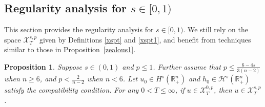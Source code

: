 \documentclass[preprint,compress,12pt]{elsarticle}
\newtheorem{proposition}[theorem]{Proposition}
\numberwithin{equation}{section}
\begin{document}
\subsection{Regularity analysis for $s\in[0,1)$}\label{painstakingly}
This section provides the regularity analysis for  $s\in[0,1)$. We still rely on the space $\mathscr{X}^{s,p}_T$ given by Definitions \ref{xspt} and \ref{xspt1}, and benefit from techniques similar to those in Proposition~\ref{zealous1}.
\begin{proposition}\label{laudatory}
	Suppose $s\in(0,1)$ and $p\leq 1$. Further assume that $p\leq \frac{6-4s}{3(n-2)}$ when $n\geq6$, and  $p<\frac{2}{n-2}$ when $n<6$.  Let $u_{0}\in H^{s}(\mathbb{R}^{n}_{+})$ and $h_{0}\in \mathcal{H}^{s}(\mathbb{R}^{n}_{+})$ satisfy the compatibility condition. For any $0<T \leq
	\infty$, if $u \in \mathscr{X}^{0,p}_T$, then  $u \in \mathscr{X}^{s,p}_T$.
\end{proposition}
\end{document}
